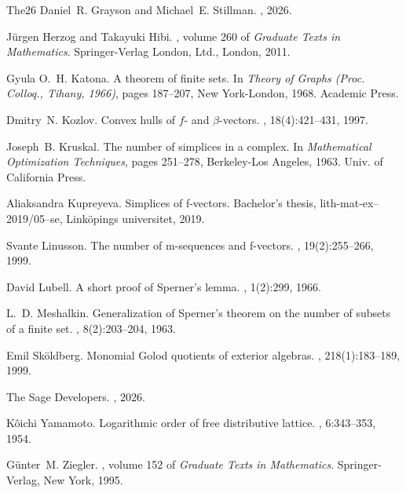 \documentclass[11pt, a4paper, abstract=yes]{scrartcl}
\theoremstyle{definition}
\theoremstyle{remark}
\theoremstyle{plain}
\begin{document}
\begin{thebibliography}{{The}26}
Daniel~R. Grayson and Michael~E. Stillman.
, 2026.

J{\"u}rgen Herzog and Takayuki Hibi.
, volume 260 of {\em Graduate Texts in
  Mathematics}.
\newblock Springer-Verlag London, Ltd., London, 2011.

Gyula O.~H. Katona.
\newblock A theorem of finite sets.
\newblock In {\em Theory of Graphs (Proc. Colloq., Tihany, 1966)}, pages
  187--207, New York-London, 1968. Academic Press.

Dmitry~N. Kozlov.
\newblock Convex hulls of $f$- and $\beta$-vectors.
, 18(4):421--431, 1997.

Joseph~B. Kruskal.
\newblock The number of simplices in a complex.
\newblock In {\em Mathematical Optimization Techniques}, pages 251--278,
  Berkeley-Los Angeles, 1963. Univ. of California Press.

Aliaksandra Kupreyeva.
\newblock Simplices of f-vectors.
\newblock Bachelor's thesis, lith-mat-ex--2019/05--se, Link{\"o}pings
  universitet, 2019.

Svante Linusson.
\newblock The number of m-sequences and f-vectors.
, 19(2):255--266, 1999.

David Lubell.
\newblock A short proof of {S}perner's lemma.
, 1(2):299, 1966.

L.~D. Meshalkin.
\newblock Generalization of {S}perner's theorem on the number of subsets of a
  finite set.
, 8(2):203--204,
  1963.

Emil Sk{\"o}ldberg.
\newblock Monomial {G}olod quotients of exterior algebras.
, 218(1):183--189, 1999.

{The Sage Developers}.
, 2026.

K\^{o}ichi Yamamoto.
\newblock Logarithmic order of free distributive lattice.
, 6:343--353, 1954.

G{\"u}nter~M. Ziegler.
, volume 152 of {\em Graduate Texts in
  Mathematics}.
\newblock Springer-Verlag, New York, 1995.

\end{thebibliography}
\end{document}
